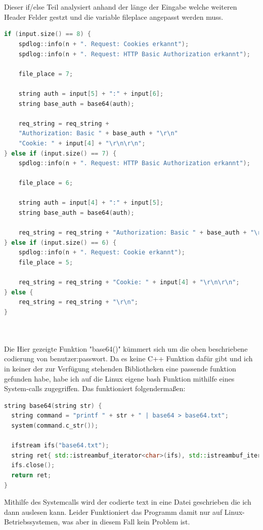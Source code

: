 \documentclass{article}
\begin{document}
\\
\\
Dieser if/else Teil analysiert anhand der länge der Eingabe welche weiteren Header Felder gestzt und die variable file\textunderscore place angepasst werden muss.
\begin{lstlisting}[language=C++]
if (input.size() == 8) {
    spdlog::info(n + ". Request: Cookies erkannt");
    spdlog::info(n + ". Request: HTTP Basic Authorization erkannt");

    file_place = 7;

    string auth = input[5] + ":" + input[6];
    string base_auth = base64(auth);

    req_string = req_string + 
    "Authorization: Basic " + base_auth + "\r\n"
    "Cookie: " + input[4] + "\r\n\r\n";        
} else if (input.size() == 7) {
    spdlog::info(n + ". Request: HTTP Basic Authorization erkannt");

    file_place = 6;

    string auth = input[4] + ":" + input[5];
    string base_auth = base64(auth);

    req_string = req_string + "Authorization: Basic " + base_auth + "\r\n\r\n";
} else if (input.size() == 6) {
    spdlog::info(n + ". Request: Cookie erkannt");
    file_place = 5;

    req_string = req_string + "Cookie: " + input[4] + "\r\n\r\n";
} else {
    req_string = req_string + "\r\n";
}
\end{lstlisting}
\\
\\
Die Hier gezeigte Funktion "base64()" kümmert sich um die oben beschriebene codierung von benutzer:passwort. 
Da es keine C++ Funktion dafür gibt und ich in keiner der zur Verfügung stehenden Bibliotheken eine passende funktion gefunden habe, habe ich auf die Linux eigene bash Funktion mithilfe eines System-calls zugegriffen. Das funktioniert folgendermaßen:
\begin{lstlisting}[language=C++]
string base64(string str) {
  string command = "printf " + str + " | base64 > base64.txt";
  system(command.c_str());

  ifstream ifs("base64.txt");
  string ret{ std::istreambuf_iterator<char>(ifs), std::istreambuf_iterator<char>() };
  ifs.close();
  return ret;
}
\end{lstlisting}
Mithilfe des Systemcalls wird der codierte text in eine Datei geschrieben die ich dann auslesen kann. Leider Funktioniert das Programm damit nur auf Linux-Betriebssystemen, was aber in diesem Fall kein Problem ist. 
\end{document}
